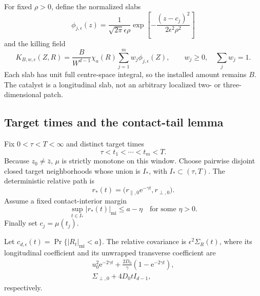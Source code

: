 \documentclass[aps,physrev,onecolumn,amsmath,amssymb,longbibliography]{revtex4-2}
\newcommand{\e}{\mathrm e}
\begin{document}
For fixed \(\rho>0\), define the normalized slabs
\begin{equation}
 \phi_{j,\epsilon}(z)=
 \frac{1}{\sqrt{2\pi}\epsilon\rho}
 \exp\!\left[-\frac{(z-c_j)^2}{2\epsilon^2\rho^2}\right]
 \label{eq:narrow-slabs}
\end{equation}
and the killing field
\begin{equation}
 K_{B,w,\epsilon}(Z,R)=
 \frac{B}{W^{d-1}}\chi_a(R)
 \sum_{j=1}^mw_j\phi_{j,\epsilon}(Z),
 \qquad w_j\ge0,\quad\sum_jw_j=1.
 \label{eq:direct-killing}
\end{equation}
Each slab has unit full centre-space integral, so the installed amount remains
\(B\).  The catalyst is a longitudinal slab, not an arbitrary localized
two- or three-dimensional patch.

\subsection{Target times and the contact-tail lemma}

Fix \(0<\tau<T<\infty\) and distinct target times
\begin{equation}
 \tau<t_1<\cdots<t_m<T.
 \label{eq:target-times}
\end{equation}
Because \(z_0\ne\bar z\), \(\mu\) is strictly monotone on this window.
Choose pairwise disjoint closed target neighborhoods whose union is \(I_*\),
with \(I_*\subset(\tau,T)\).  The deterministic relative path is
\begin{equation}
 r_*(t)=\bigl(r_{\parallel,0}\e^{-\gamma t},r_{\perp,0}\bigr).
 \label{eq:deterministic-relative-path}
\end{equation}
Assume a fixed contact-interior margin
\begin{equation}
 \sup_{t\in I_*}|r_*(t)|_{\mathrm{mi}}\le a-\eta
 \quad\text{for some }\eta>0.
 \label{eq:contact-interior}
\end{equation}
Finally set \(c_j=\mu(t_j)\).

Let
\(c_{d,\epsilon}(t)=\Pr\{|R_t|_{\mathrm{mi}}<a\}\).
The relative covariance is \(\epsilon^2\Sigma_R(t)\), where its longitudinal
coefficient and its unwrapped transverse coefficient are
\begin{align}
 u_0^2\e^{-2\gamma t}
 +\frac{2D_0}{\gamma}(1-\e^{-2\gamma t}),
 \label{eq:relative-long-variance}\\
 \Sigma_{\perp,0}+4D_0tI_{d-1},
 \label{eq:relative-transverse-variance}
\end{align}
respectively.
\end{document}

